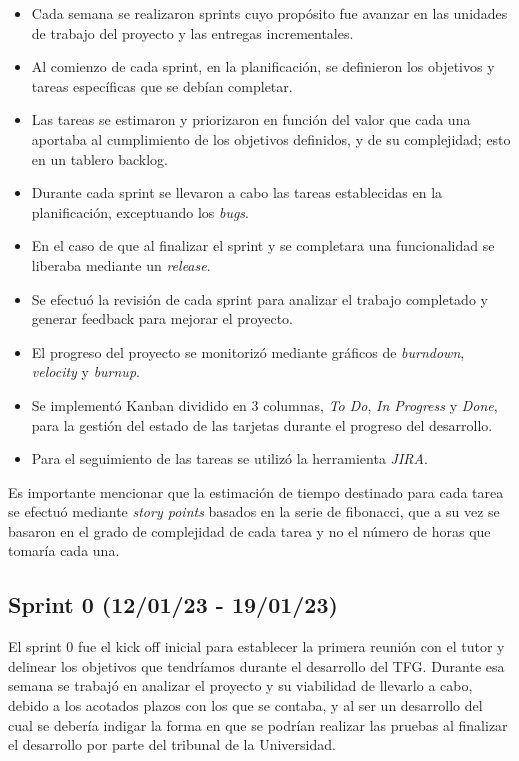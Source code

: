 \begin{itemize}
\tightlist
\item
    Cada semana se realizaron sprints cuyo propósito fue avanzar en las unidades de trabajo del proyecto y las entregas incrementales.
\item
    Al comienzo de cada sprint, en la planificación, se definieron los objetivos y tareas específicas que se debían completar.
\item 
    Las tareas se estimaron y priorizaron en función del valor que cada una aportaba al cumplimiento de los objetivos definidos, y de su complejidad; esto en un tablero backlog. 
\item 
    Durante cada sprint se llevaron a cabo las tareas establecidas en la planificación, exceptuando los \emph{bugs}.
\item 
    En el caso de que al finalizar el sprint y se completara una funcionalidad se liberaba mediante un \emph{release}. 
\item 
    Se efectuó la revisión de cada sprint para analizar el trabajo completado y generar feedback para mejorar el proyecto.
\item
    El progreso del proyecto se monitorizó mediante gráficos de \emph{burndown}, \emph{velocity} y \emph{burnup}.
\item 
    Se implementó Kanban dividido en 3 columnas, \emph{To Do}, \emph{In Progress} y \emph{Done}, para la gestión del estado de las tarjetas durante el progreso del desarrollo.
\item 
    Para el seguimiento de las tareas se utilizó la herramienta \emph{JIRA}.
    
\end{itemize}
Es importante mencionar que la estimación de tiempo destinado para cada tarea se efectuó mediante \emph{story points} basados en la serie de fibonacci, que a su vez se basaron en el grado de complejidad de cada tarea y no el número de horas que tomaría cada una.

\subsection{Sprint 0 (12/01/23 - 19/01/23)}\label{sprint-0-120123---190123}
El sprint 0 fue el kick off inicial para establecer la primera reunión con el tutor y delinear los objetivos que tendríamos durante el desarrollo del TFG.
Durante esa semana se trabajó en analizar el proyecto y su viabilidad de llevarlo a cabo, debido a los acotados plazos con los que se contaba, y al ser un desarrollo del cual se debería indigar la forma en que se podrían realizar las pruebas al finalizar el desarrollo por parte del tribunal de la Universidad.

